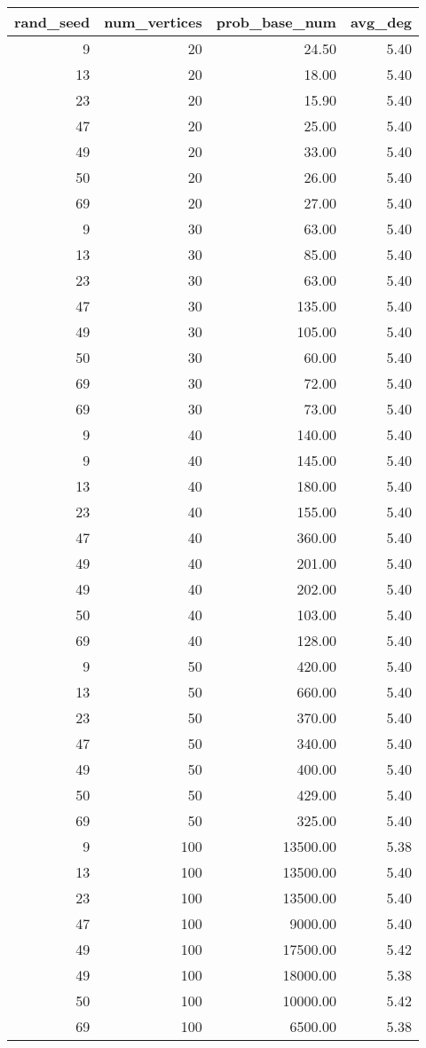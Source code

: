 \begin{tabular}{rrrr}
\toprule
rand_seed & num_vertices & prob_base_num & avg_deg \\
\midrule
9 & 20 & 24.50 & 5.40 \\
13 & 20 & 18.00 & 5.40 \\
23 & 20 & 15.90 & 5.40 \\
47 & 20 & 25.00 & 5.40 \\
49 & 20 & 33.00 & 5.40 \\
50 & 20 & 26.00 & 5.40 \\
69 & 20 & 27.00 & 5.40 \\
9 & 30 & 63.00 & 5.40 \\
13 & 30 & 85.00 & 5.40 \\
23 & 30 & 63.00 & 5.40 \\
47 & 30 & 135.00 & 5.40 \\
49 & 30 & 105.00 & 5.40 \\
50 & 30 & 60.00 & 5.40 \\
69 & 30 & 72.00 & 5.40 \\
69 & 30 & 73.00 & 5.40 \\
9 & 40 & 140.00 & 5.40 \\
9 & 40 & 145.00 & 5.40 \\
13 & 40 & 180.00 & 5.40 \\
23 & 40 & 155.00 & 5.40 \\
47 & 40 & 360.00 & 5.40 \\
49 & 40 & 201.00 & 5.40 \\
49 & 40 & 202.00 & 5.40 \\
50 & 40 & 103.00 & 5.40 \\
69 & 40 & 128.00 & 5.40 \\
9 & 50 & 420.00 & 5.40 \\
13 & 50 & 660.00 & 5.40 \\
23 & 50 & 370.00 & 5.40 \\
47 & 50 & 340.00 & 5.40 \\
49 & 50 & 400.00 & 5.40 \\
50 & 50 & 429.00 & 5.40 \\
69 & 50 & 325.00 & 5.40 \\
9 & 100 & 13500.00 & 5.38 \\
13 & 100 & 13500.00 & 5.40 \\
23 & 100 & 13500.00 & 5.40 \\
47 & 100 & 9000.00 & 5.40 \\
49 & 100 & 17500.00 & 5.42 \\
49 & 100 & 18000.00 & 5.38 \\
50 & 100 & 10000.00 & 5.42 \\
69 & 100 & 6500.00 & 5.38 \\
\bottomrule
\end{tabular}
